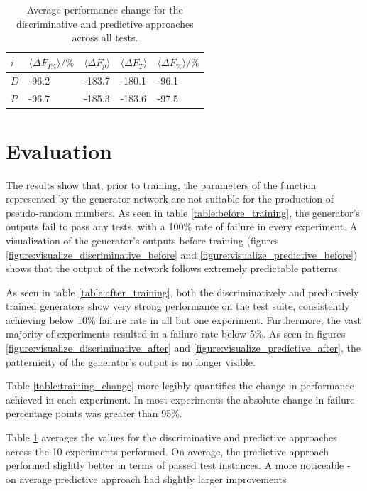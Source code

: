 \documentclass[12pt, titlepage]{report}
\theoremstyle{definition}
\begin{document}
{\begin{table}[H]
    \begin{tabularx}{\textwidth}{lXXXX} \toprule
    {$i$}     & {$\langle \Delta F_{I\%} \rangle / \%$}	& {$\langle \Delta F_p \rangle$} 	& {$\langle \Delta F_T \rangle$} 	& {$\langle \Delta F_{\%} \rangle / \%$} \\ \midrule
    $D$ & -96.2 						& -183.7					& 	-180.1	  					& -96.1 \\ \midrule
    $P$ & -96.7  						& -185.3					& -183.6						& -97.5 \\ \bottomrule
\end{tabularx}
\caption[Average performance change across all experiments]{Average performance change for the discriminative and predictive approaches across all tests.}
\label{table:avg_result}
\end{table}


\section{Evaluation}\label{subsection:evaluation}
The results show that, prior to training, the parameters of the function represented by the generator network are not suitable for the production of pseudo-random numbers. As seen in table \ref{table:before_training}, the generator's outputs fail to pass any tests, with a 100\% rate of failure in every experiment. A visualization of the generator's outputs before training (figures \ref{figure:visualize_discriminative_before} and \ref{figure:visualize_predictive_before}) shows that the output of the network follows extremely predictable patterns.

As seen in table \ref{table:after_training}, both the discriminatively and predictively trained generators show very strong performance on the test suite, consistently achieving below 10\% failure rate in all but one experiment. Furthermore, the vast majority of experiments resulted in a failure rate below 5\%. As seen in figures \ref{figure:visualize_discriminative_after} and \ref{figure:visualize_predictive_after}, the patternicity of the generator's output is no longer visible.

Table \ref{table:training_change} more legibly quantifies the change in performance achieved in each experiment. In most experiments the absolute change in failure percentage points was greater than 95\%. 

Table \ref{table:avg_result} averages the values for the discriminative and predictive approaches across the 10 experiments performed. On average, the predictive approach performed slightly better in terms of passed test instances. A more noticeable 
- on average predictive approach had slightly larger improvements

}
\end{document}
